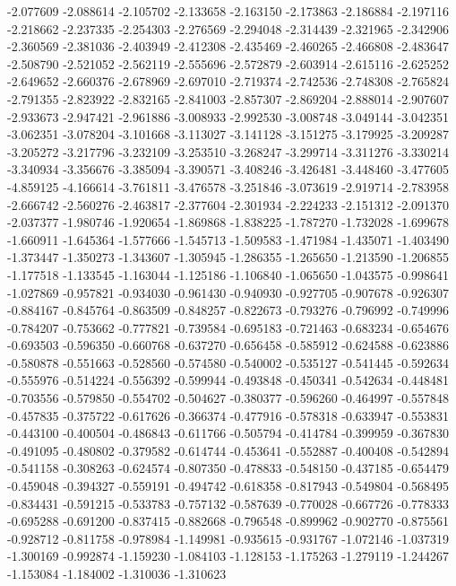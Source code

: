 -2.077609
-2.088614
-2.105702
-2.133658
-2.163150
-2.173863
-2.186884
-2.197116
-2.218662
-2.237335
-2.254303
-2.276569
-2.294048
-2.314439
-2.321965
-2.342906
-2.360569
-2.381036
-2.403949
-2.412308
-2.435469
-2.460265
-2.466808
-2.483647
-2.508790
-2.521052
-2.562119
-2.555696
-2.572879
-2.603914
-2.615116
-2.625252
-2.649652
-2.660376
-2.678969
-2.697010
-2.719374
-2.742536
-2.748308
-2.765824
-2.791355
-2.823922
-2.832165
-2.841003
-2.857307
-2.869204
-2.888014
-2.907607
-2.933673
-2.947421
-2.961886
-3.008933
-2.992530
-3.008748
-3.049144
-3.042351
-3.062351
-3.078204
-3.101668
-3.113027
-3.141128
-3.151275
-3.179925
-3.209287
-3.205272
-3.217796
-3.232109
-3.253510
-3.268247
-3.299714
-3.311276
-3.330214
-3.340934
-3.356676
-3.385094
-3.390571
-3.408246
-3.426481
-3.448460
-3.477605
-4.859125
-4.166614
-3.761811
-3.476578
-3.251846
-3.073619
-2.919714
-2.783958
-2.666742
-2.560276
-2.463817
-2.377604
-2.301934
-2.224233
-2.151312
-2.091370
-2.037377
-1.980746
-1.920654
-1.869868
-1.838225
-1.787270
-1.732028
-1.699678
-1.660911
-1.645364
-1.577666
-1.545713
-1.509583
-1.471984
-1.435071
-1.403490
-1.373447
-1.350273
-1.343607
-1.305945
-1.286355
-1.265650
-1.213590
-1.206855
-1.177518
-1.133545
-1.163044
-1.125186
-1.106840
-1.065650
-1.043575
-0.998641
-1.027869
-0.957821
-0.934030
-0.961430
-0.940930
-0.927705
-0.907678
-0.926307
-0.884167
-0.845764
-0.863509
-0.848257
-0.822673
-0.793276
-0.796992
-0.749996
-0.784207
-0.753662
-0.777821
-0.739584
-0.695183
-0.721463
-0.683234
-0.654676
-0.693503
-0.596350
-0.660768
-0.637270
-0.656458
-0.585912
-0.624588
-0.623886
-0.580878
-0.551663
-0.528560
-0.574580
-0.540002
-0.535127
-0.541445
-0.592634
-0.555976
-0.514224
-0.556392
-0.599944
-0.493848
-0.450341
-0.542634
-0.448481
-0.703556
-0.579850
-0.554702
-0.504627
-0.380377
-0.596260
-0.464997
-0.557848
-0.457835
-0.375722
-0.617626
-0.366374
-0.477916
-0.578318
-0.633947
-0.553831
-0.443100
-0.400504
-0.486843
-0.611766
-0.505794
-0.414784
-0.399959
-0.367830
-0.491095
-0.480802
-0.379582
-0.614744
-0.453641
-0.552887
-0.400408
-0.542894
-0.541158
-0.308263
-0.624574
-0.807350
-0.478833
-0.548150
-0.437185
-0.654479
-0.459048
-0.394327
-0.559191
-0.494742
-0.618358
-0.817943
-0.549804
-0.568495
-0.834431
-0.591215
-0.533783
-0.757132
-0.587639
-0.770028
-0.667726
-0.778333
-0.695288
-0.691200
-0.837415
-0.882668
-0.796548
-0.899962
-0.902770
-0.875561
-0.928712
-0.811758
-0.978984
-1.149981
-0.935615
-0.931767
-1.072146
-1.037319
-1.300169
-0.992874
-1.159230
-1.084103
-1.128153
-1.175263
-1.279119
-1.244267
-1.153084
-1.184002
-1.310036
-1.310623

